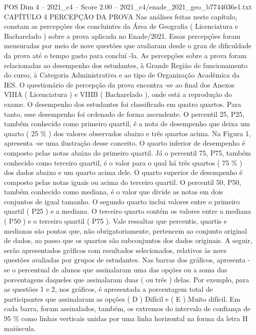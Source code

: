 \begin{textsample}{POS Dim 4 – 2021\_c4 – Score 2.00 – 2021\_c4/enade\_2021\_geo\_b7744036e1.txt}  \label{ex:f4_pos_132}
CAPÍTULO 4 PERCEPÇÃO DA PROVA Nas análises feitas neste capítulo, constam as percepções dos concluintes da Área de Geografia ( Licenciatura e Bacharelado ) sobre a prova aplicada no Enade/2021.
Essas percepções foram mensuradas por meio de nove questões que avaliaram desde o grau de dificuldade da prova até o tempo gasto para concluí -la.
As percepções sobre a prova foram relacionadas ao desempenho dos estudantes, à Grande Região de funcionamento do curso, à Categoria Administrativa e ao tipo de Organização Acadêmica da IES.
O questionário de percepção da prova encontra -se ao final dos Anexos VIIIA ( Licenciatura ) e VIIIB ( Bacharelado ), onde está a reprodução do exame.
O desempenho dos estudantes foi classificado em quatro quartos.
Para tanto, esse desempenho foi ordenado de forma ascendente.
O percentil 25, P25, também conhecido como primeiro quartil, é a nota de desempenho que deixa um quarto ( 25 \% ) dos valores observados abaixo e três quartos acima.
Na Figura 1, apresenta -se uma ilustração desse conceito.
O quarto inferior de desempenho é composto pelas notas abaixo do primeiro quartil.
Já o percentil 75, P75, também conhecido como terceiro quartil, é o valor para o qual há três quartos ( 75 \% ) dos dados abaixo e um quarto acima dele.
O quarto superior de desempenho é composto pelas notas iguais ou acima do terceiro quartil.
O percentil 50, P50, também conhecido como mediana, é o valor que divide as notas em dois conjuntos de igual tamanho.
O segundo quarto inclui valores entre o primeiro quartil ( P25 ) e a mediana.
O terceiro quarto contém os valores entre a mediana ( P50 ) e o terceiro quartil ( P75 ).
Vale ressaltar que percentis, quartis e medianas são pontos que, não obrigatoriamente, pertencem ao conjunto original de dados, ao passo que os quartos são subconjuntos dos dados originais.
A seguir, serão apresentados gráficos com resultados selecionados, relativos às nove questões avaliadas por grupos de estudantes.
Nas barras dos gráficos, apresenta -se o percentual de alunos que assinalaram uma das opções ou a soma das porcentagens daqueles que assinalaram duas ( ou três ) delas.
Por exemplo, para as questões 1 e 2, nos gráficos, é apresentada a porcentagem total de participantes que assinalaram as opções ( D ) Difícil e ( E ) Muito difícil.
Em cada barra, foram assinalados, também, os extremos do intervalo de confiança de 95 \% como linhas verticais unidas por uma linha horizontal na forma da letra H maiúscula.

\end{textsample}
